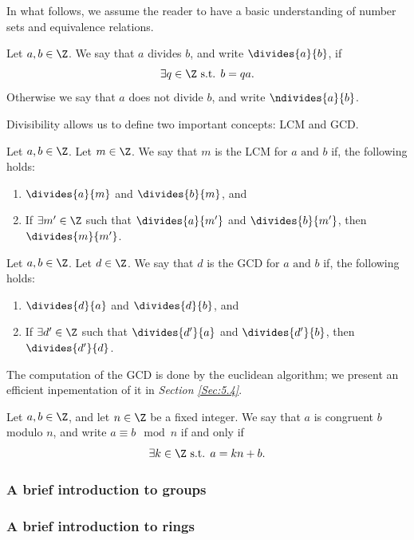 \documentclass{subfiles}
\begin{document}
    In what follows, we assume the reader to have a basic understanding of number sets 
    and equivalence relations.

    \begin{definition*}[Divisibility]
        Let \(a, b \in \Z\). We say that \(a\) divides \(b\), and write \(\divides{a}{b}\),
        if 
        \[
            \exists q \in \Z \text{ s.t. } b = qa.
        \]
        Otherwise we say that \(a\) does not divide \(b\), and write \(\ndivides{a}{b}\).
    \end{definition*}

    Divisibility allows us to define two important concepts: LCM and GCD.
    \begin{definition*}[LCM]
        Let \(a, b \in \Z\). Let \(m \in \Z\). We say that \(m\) is the LCM for 
            \(a \text{ and } b\) if, the following holds:
            \begin{enumerate}
                \item \(\divides{a}{m}\) and \(\divides{b}{m}\), and 
                \item If \(\exists m' \in \Z\) such that \(\divides{a}{m'}\) and 
                    \(\divides{b}{m'}\), then \(\divides{m}{m'}\).
            \end{enumerate}
    \end{definition*}

    \begin{definition*}[GCD]
        Let \(a, b \in \Z\). Let \(d \in \Z\). We say that \(d\) is the GCD for 
            \(a \text{ and } b\) if, the following holds:
            \begin{enumerate}
                \item \(\divides{d}{a}\) and \(\divides{d}{b}\), and 
                \item If \(\exists d' \in \Z\) such that \(\divides{d'}{a}\) and 
                    \(\divides{d'}{b}\), then \(\divides{d'}{d}\).
            \end{enumerate}
    \end{definition*}

    The computation of the GCD is done by the euclidean algorithm;
        we present an efficient inpementation of it in \emph{Section \ref{Sec:5.4}}.

    \begin{definition*}
        Let \(a, b \in \Z\), and let \(n \in \Z\) be a fixed integer. 
        We say that \(a\) is congruent \(b\) modulo \(n\), and write 
        \(a \equiv b \mod{n}\) if and only if 
        \[
            \exists k \in \Z \text{ s.t. } a = kn + b.
        \]
    \end{definition*}

    \subsubsection{A brief introduction to groups}
    

    \subsubsection{A brief introduction to rings}
    
\end{document}
